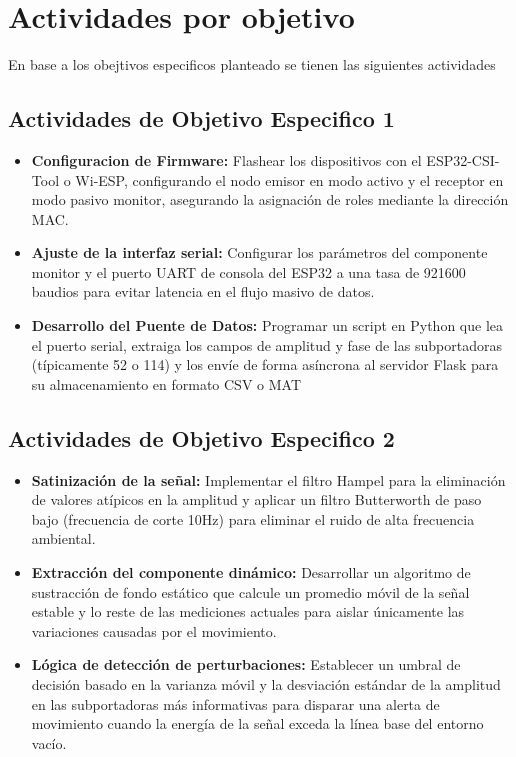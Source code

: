 \documentclass[12pt, a4paper]{article}
\begin{document}
\section{Actividades por objetivo}
En base a los obejtivos especificos planteado se tienen las siguientes actividades
\subsection{Actividades de Objetivo Especifico 1}
\begin{itemize}
\item \textbf{Configuracion de Firmware:} Flashear los dispositivos con el ESP32-CSI-Tool o Wi-ESP, configurando el nodo emisor en modo activo y el receptor en modo pasivo monitor, asegurando la asignación de roles mediante la dirección MAC.
\item \textbf{Ajuste de la interfaz serial:} Configurar los parámetros del componente monitor y el puerto UART de consola del ESP32 a una tasa de 921600 baudios para evitar latencia en el flujo masivo de datos.
\item \textbf{Desarrollo del Puente de Datos:} Programar un script en Python que lea el puerto serial, extraiga los campos de amplitud y fase de las subportadoras (típicamente 52 o 114) y los envíe de forma asíncrona al servidor Flask para su almacenamiento en formato CSV o MAT
\end{itemize}

\subsection{Actividades de Objetivo Especifico 2}
\begin{itemize}
\item \textbf{Satinización de la señal:} Implementar el filtro Hampel para la eliminación de valores atípicos en la amplitud y aplicar un filtro Butterworth de paso bajo (frecuencia de corte 10Hz) para eliminar el ruido de alta frecuencia ambiental.
\item \textbf{Extracción del componente dinámico:} Desarrollar un algoritmo de sustracción de fondo estático que calcule un promedio móvil de la señal estable y lo reste de las mediciones actuales para aislar únicamente las variaciones causadas por el movimiento.
\item \textbf{Lógica de detección de perturbaciones:} Establecer un umbral de decisión basado en la varianza móvil y la desviación estándar de la amplitud en las subportadoras más informativas para disparar una alerta de movimiento cuando la energía de la señal exceda la línea base del entorno vacío.
\end{itemize}
\end{document}
